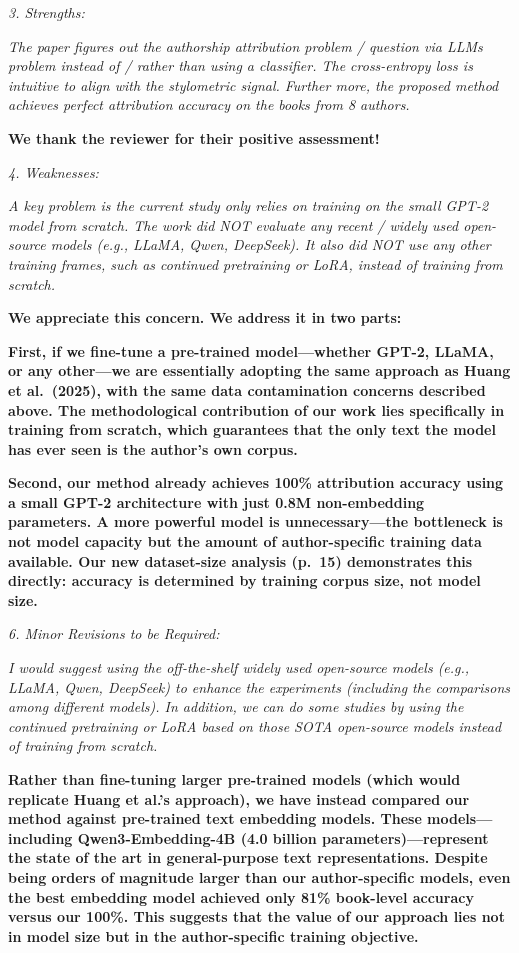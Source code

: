 \documentclass[11pt]{article}
\newcommand{\pref}[1]{p.~#1}
\begin{document}
\textit{3. Strengths:}

\textit{The paper figures out the authorship attribution problem / question via
LLMs problem instead of / rather than using a classifier. The cross-entropy
loss is intuitive to align with the stylometric signal. Further more, the
proposed method achieves perfect attribution accuracy on the books from 8
authors.}

\textbf{We thank the reviewer for their positive assessment!}

\textit{4. Weaknesses:}

\textit{A key problem is the current study only relies on training on the small
GPT-2 model from scratch. The work did NOT evaluate any recent / widely used
open-source models (e.g., LLaMA, Qwen, DeepSeek). It also did NOT use any other
training frames, such as continued pretraining or LoRA, instead of training
from scratch.}

\textbf{We appreciate this concern. We address it in two parts:}

\textbf{First, if we fine-tune a pre-trained model---whether GPT-2, LLaMA, or
any other---we are essentially adopting the same approach as Huang et al.\
(2025), with the same data contamination concerns described above. The
methodological contribution of our work lies specifically in training from
scratch, which guarantees that the only text the model has ever seen is the
author's own corpus.}

\textbf{Second, our method already achieves 100\% attribution accuracy using a
small GPT-2 architecture with just 0.8M non-embedding parameters. A more
powerful model is unnecessary---the bottleneck is not model capacity but the
amount of author-specific training data available. Our new dataset-size
analysis (\pref{15}) demonstrates this directly: accuracy is determined by
training corpus size, not model size.}

\textit{6. Minor Revisions to be Required:}

\textit{I would suggest using the off-the-shelf widely used open-source models (e.g., LLaMA, Qwen, DeepSeek) to enhance the experiments (including the comparisons among different models). In addition, we can do some studies by using the continued pretraining or LoRA based on those SOTA open-source models instead of training from scratch.}

\textbf{Rather than fine-tuning larger pre-trained models (which would
replicate Huang et al.'s approach), we have instead compared our method against
pre-trained text embedding models. These models---including Qwen3-Embedding-4B
(4.0 billion parameters)---represent the state of the art in general-purpose
text representations. Despite being orders of magnitude larger than our
author-specific models, even the best embedding model achieved only 81\%
book-level accuracy versus our 100\%. This suggests that the value of our
approach lies not in model size but in the author-specific training objective.}
\end{document}
